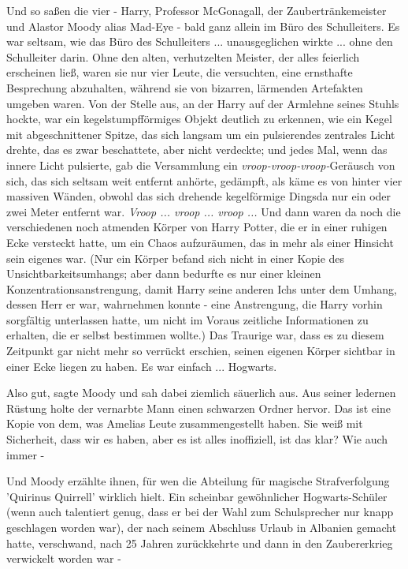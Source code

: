 Und so saßen die vier - Harry, Professor McGonagall, der Zaubertränkemeister und
Alastor Moody alias \glqq{}Mad-Eye\grqq{} - bald ganz allein im Büro des
Schulleiters. Es war seltsam, wie das Büro des Schulleiters ... unausgeglichen
wirkte ... ohne den Schulleiter darin. Ohne den alten, verhutzelten Meister, der
alles feierlich erscheinen ließ, waren sie nur vier Leute, die versuchten, eine
ernsthafte Besprechung abzuhalten, während sie von bizarren, lärmenden
Artefakten umgeben waren. Von der Stelle aus, an der Harry auf der Armlehne
seines Stuhls hockte, war ein kegelstumpfförmiges Objekt deutlich zu erkennen,
wie ein Kegel mit abgeschnittener Spitze, das sich langsam um ein pulsierendes
zentrales Licht drehte, das es zwar beschattete, aber nicht verdeckte; und jedes
Mal, wenn das innere Licht pulsierte, gab die Versammlung ein
\emph{vroop-vroop-vroop-}Geräusch von sich, das sich seltsam weit entfernt
anhörte, gedämpft, als käme es von hinter vier massiven Wänden, obwohl das sich
drehende kegelförmige Dingsda nur ein oder zwei Meter entfernt war.
\emph{Vroop ... vroop ... vroop ...} Und dann waren da noch die verschiedenen noch
atmenden Körper von Harry Potter, die er in einer ruhigen Ecke versteckt hatte,
um ein Chaos aufzuräumen, das in mehr als einer Hinsicht sein eigenes war. (Nur
ein Körper befand sich nicht in einer Kopie des Unsichtbarkeitsumhangs; aber
dann bedurfte es nur einer kleinen Konzentrationsanstrengung, damit Harry seine
anderen Ichs unter dem Umhang, dessen Herr er war, wahrnehmen konnte - eine
Anstrengung, die Harry vorhin sorgfältig unterlassen hatte, um nicht im Voraus
zeitliche Informationen zu erhalten, die er selbst bestimmen wollte.) Das
Traurige war, dass es zu diesem Zeitpunkt gar nicht mehr so verrückt erschien,
seinen eigenen Körper sichtbar in einer Ecke liegen zu haben. Es war einfach ...
Hogwarts.

\glqq{}Also gut\grqq{}, sagte Moody und sah dabei ziemlich säuerlich aus. Aus
seiner ledernen Rüstung holte der vernarbte Mann einen schwarzen Ordner hervor.
\glqq{}Das ist eine Kopie von dem, was Amelias Leute zusammengestellt haben. Sie
weiß mit Sicherheit, dass wir es haben, aber es ist alles inoffiziell, ist das
klar? Wie auch immer -\grqq{}

Und Moody erzählte ihnen, für wen die Abteilung für magische Strafverfolgung
'Quirinus Quirrell' wirklich hielt. Ein scheinbar gewöhnlicher Hogwarts-Schüler
(wenn auch talentiert genug, dass er bei der Wahl zum Schulsprecher nur knapp
geschlagen worden war), der nach seinem Abschluss Urlaub in Albanien gemacht
hatte, verschwand, nach 25 Jahren zurückkehrte und dann in den Zaubererkrieg
verwickelt worden war -

